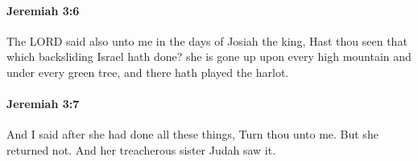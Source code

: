 		\paragraph{Jeremiah 3:6} %
			\label{JEREMIAH-3-6}

			The LORD said also unto me in the days of Josiah the king, Hast thou seen that which backsliding Israel hath done? she is gone up upon every high mountain and under every green tree, and there hath played the harlot.


		\paragraph{Jeremiah 3:7} %
			\label{JEREMIAH-3-7}

			And I said after she had done all these things, Turn thou unto me. But she returned not. And her treacherous sister Judah saw it.


